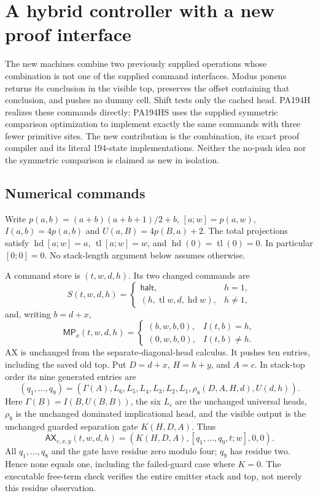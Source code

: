 \section{A hybrid controller with a new proof interface}
\label{sec:hybrid-proof}

The new machines combine two previously supplied operations whose
combination is not one of the supplied command interfaces.  Modus ponens
returns its conclusion in the visible top, preserves the offset containing
that conclusion, and pushes no dummy cell.  Shift tests only the cached
head.  PA194H realizes these commands directly; PA194HS uses the supplied
symmetric comparison optimization to implement exactly the same commands
with three fewer primitive sites.  The new contribution is the combination,
its exact proof compiler and its literal 194-state implementations.  Neither
the no-push idea nor the symmetric comparison is claimed as new in isolation.

\subsection{Numerical commands}

Write $p(a,b)=(a+b)(a+b+1)/2+b$, $[a;w]=p(a,w)$,
$I(a,b)=4p(a,b)$ and $U(a,B)=4p(B,a)+2$.  The total projections satisfy
$\operatorname{hd}[a;w]=a$, $\operatorname{tl}[a;w]=w$, and
$\operatorname{hd}(0)=\operatorname{tl}(0)=0$.  In particular $[0;0]=0$.
No stack-length argument below assumes otherwise.

A command store is $(t,w,d,h)$.  Its two changed commands are
\[
 S(t,w,d,h)=
 \begin{cases}
 \mathsf{halt},&h=1,\\
 (h,\operatorname{tl}w,d,\operatorname{hd}w),&h\ne1,
 \end{cases}
\]
and, writing $b=d+x$,
\[
 \mathsf{MP}_x(t,w,d,h)=
 \begin{cases}
 (b,w,b,0),&I(t,b)=h,\\
 (0,w,b,0),&I(t,b)\ne h.
 \end{cases}
\]
AX is unchanged from the separate-diagonal-head calculus.  It pushes ten
entries, including the saved old top.  Put $D=d+x$, $H=h+y$, and $A=c$.
In stack-top order its nine generated entries are
\[
 (q_1,\ldots,q_9)=
 (\Gamma(A),L_6,L_5,L_4,L_3,L_2,L_1,\rho_8(D,A,H,d),U(d,h)).
\]
Here $\Gamma(B)=I(B,U(B,B))$, the six $L_i$ are the unchanged universal
heads, $\rho_8$ is the unchanged dominated implicational head, and the
visible output is the unchanged guarded separation gate $K(H,D,A)$.
Thus
\[
 \mathsf{AX}_{c,x,y}(t,w,d,h)=
 (K(H,D,A),[q_1,\ldots,q_9,t;w],0,0).
\]
All $q_1,\ldots,q_8$ and the gate have residue zero modulo four;
$q_9$ has residue two.  Hence none equals one, including the failed-guard
case where $K=0$.  The executable free-term check verifies the entire
emitter stack and top, not merely this residue observation.

